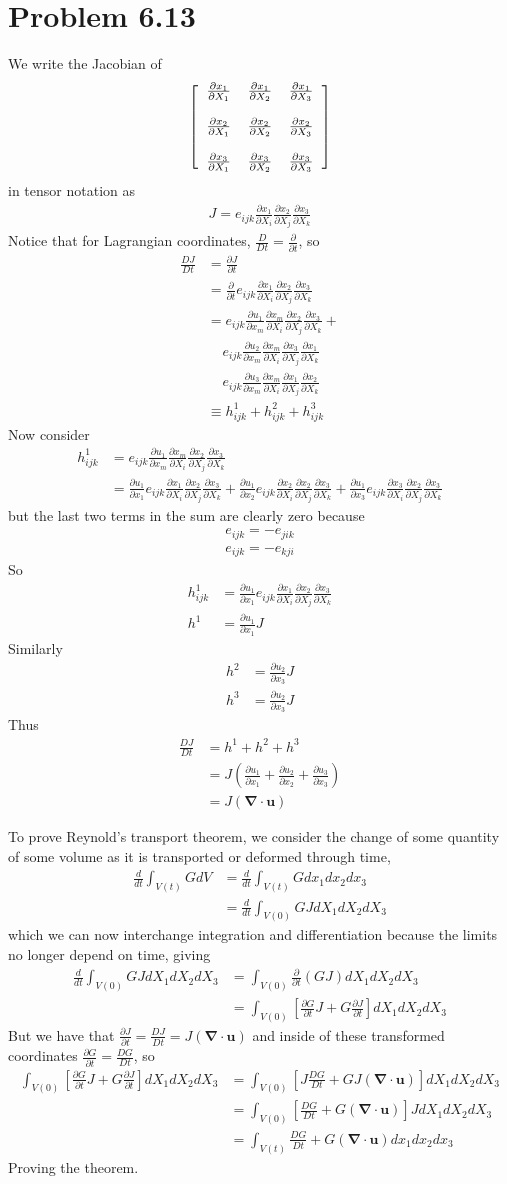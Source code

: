 \documentclass[12pt]{article}
\newcommand{\eq}[1]{\begin{align*}#1\end{align*}}
\newcommand{\p}[2]{\frac{\partial#1}{\partial#2}}
\newcommand{\de}[2]{\frac{d#1}{d#2}}
\newcommand{\n}{\bm{\nabla}}
\newcommand{\mat}[2]{\left[\begin{tabular}{#1}#2\end{tabular}\right]}
\begin{document}
\section*{Problem 6.13}
We write the Jacobian of
\eq{
	\mat{ccc}{
		$\p{x_1}{X_1}$ & $\p{x_1}{X_2}$ & $\p{x_1}{X_3}$ \\
		\\
		$\p{x_2}{X_1}$ & $\p{x_2}{X_2}$ & $\p{x_2}{X_3}$ \\
		\\
		$\p{x_3}{X_1}$ & $\p{x_3}{X_2}$ & $\p{x_3}{X_3}$ \\
	}
}
in tensor notation as
\eq{
	J = e_{ijk}\p{x_1}{X_i}\p{x_2}{X_j}\p{x_3}{X_k}
}
Notice that for Lagrangian coordinates, $\frac{D}{Dt} = \p{}{t}$, so
\eq{
	\frac{DJ}{Dt} &= \p{J}{t}\\
	&= \p{}{t}e_{ijk}\p{x_1}{X_i}\p{x_2}{X_j}\p{x_3}{X_k}\\
	&= e_{ijk} \p{u_1}{x_m} \p{x_m}{X_i}\p{x_2}{X_j}\p{x_3}{X_k} + \\
	& \;\;\;\;e_{ijk} \p{u_2}{x_m} \p{x_m}{X_i}\p{x_3}{X_j}\p{x_1}{X_k}\\
	& \;\;\;\;e_{ijk} \p{u_3}{x_m} \p{x_m}{X_i}\p{x_1}{X_j}\p{x_2}{X_k}\\
	&\equiv h^1_{ijk} + h^2_{ijk} + h^3_{ijk}
}
Now consider
\eq{
	h^1_{ijk} &= e_{ijk} \p{u_1}{x_m} \p{x_m}{X_i}\p{x_2}{X_j}\p{x_3}{X_k}\\
	&= \p{u_1}{x_1} e_{ijk}\p{x_1}{X_i}\p{x_2}{X_j}\p{x_3}{X_k} + \p{u_1}{x_2} e_{ijk}\p{x_2}{X_i}\p{x_2}{X_j}\p{x_3}{X_k} + \p{u_1}{x_3} e_{ijk}\p{x_3}{X_i}\p{x_2}{X_j}\p{x_3}{X_k}
}
but the last two terms in the sum are clearly zero because
\eq{
	e_{ijk} = -e_{jik}\\
	e_{ijk} = -e_{kji}
}
So
\eq{
	h^1_{ijk} &= \p{u_1}{x_1} e_{ijk}\p{x_1}{X_i}\p{x_2}{X_j}\p{x_3}{X_k}\\
	h^1 &= \p{u_1}{x_1} J
}
Similarly
\eq{
	h^2 &= \p{u_2}{x_3} J\\
	h^3 &= \p{u_2}{x_3} J
}
Thus
\eq{
	\frac{DJ}{Dt} &= h^1 + h^2 + h^3\\
	&= J(\p{u_1}{x_1} + \p{u_2}{x_2} + \p{u_3}{x_3})\\
	&= J(\n \cdot \bm{u})
}

To prove Reynold's transport theorem, we consider the change of some quantity of some volume as it is transported or deformed through time,
\eq{
	\de{}{t}\int_{V(t)} G dV &= \de{}{t} \int_{V(t)} G dx_1dx_2dx_3\\
	&= \de{}{t} \int_{V(0)} GJ dX_1 dX_2 dX_3
}
which we can now interchange integration and differentiation because the limits no longer depend on time, giving
\eq{
	\de{}{t} \int_{V(0)} GJ dX_1 dX_2 dX_3 &= \int_{V(0)} \p{}{t} (GJ) dX_1 dX_2 dX_3\\
	&= \int_{V(0)} \left[\p{G}{t}J + G\p{J}{t}\right] dX_1 dX_2 dX_3
}
But we have that $\p{J}{t} = \frac{DJ}{Dt} = J(\n \cdot \bm{u})$ and inside of these transformed coordinates $\p{G}{t} = \frac{DG}{Dt}$, so
\eq{
	\int_{V(0)} \left[\p{G}{t}J + G\p{J}{t}\right] dX_1 dX_2 dX_3 &= \int_{V(0)} \left[J\frac{DG}{Dt} + GJ(\n \cdot \bm{u})\right] dX_1 dX_2 dX_3\\
	&=\int_{V(0)} \left[\frac{DG}{Dt} + G(\n \cdot \bm{u})\right]J dX_1 dX_2 dX_3\\
	&= \int_{V(t)} \frac{DG}{Dt} + G(\n \cdot \bm{u}) dx_1 dx_2 dx_3
}
Proving the theorem.
\end{document}
